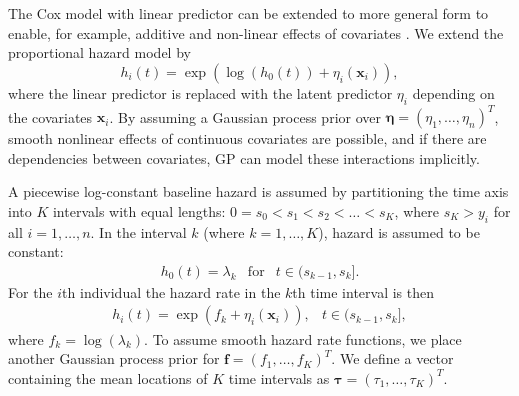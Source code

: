 \documentclass[twoside,11pt]{article}
\begin{document}
The Cox model with linear predictor can be extended to more general
form to enable, for example, additive and non-linear effects of
covariates \citep{Kneib:2006,Martino:2011}. We extend the proportional
hazard model by
\begin{equation}
h_i(t)=\exp(\log(h_0(t))+\eta_i(\bm{x}_i)),
\end{equation}
where the linear predictor is replaced with the latent predictor
$\eta_i$ depending on the covariates $\bm{x}_i$. By assuming a
Gaussian process prior over
$\bm{\eta}=(\eta_1,\ldots,\eta_n)^T$, smooth nonlinear effects of
continuous covariates are possible, and if there are dependencies
between covariates, GP can model these interactions implicitly. 

A piecewise log-constant baseline hazard \citep[see,
e.g.][]{Ibrahim+Chen+Sinha:2001,Martino:2011} is assumed by
partitioning the time axis into $K$ intervals with equal lengths:
$0=s_0<s_1<s_2<\ldots<s_K$, where $s_K>y_i$ for all $i=1,\ldots,n$. In
the interval $k$ (where $k=1,\ldots,K$), hazard is assumed to be
constant:
\begin{eqnarray}
h_0(t)=\lambda_k&\mathrm{for}&t\in(s_{k-1},s_k].
\end{eqnarray}
For the $i$th individual the hazard rate in the $k$th time interval is
then
\begin{eqnarray}
h_i(t)=\exp(f_k+\eta_i(\bm{x}_i)), & t\in(s_{k-1},s_k],
\end{eqnarray}
where $f_k=\log(\lambda_k)$. To assume smooth hazard rate functions,
we place another Gaussian process prior for
$\bm{f}=(f_1,\ldots,f_K)^T$. We define a vector containing the mean
locations of $K$ time intervals as
$\bm{\tau}=(\tau_1,\ldots,\tau_K)^T$. 

\end{document}
